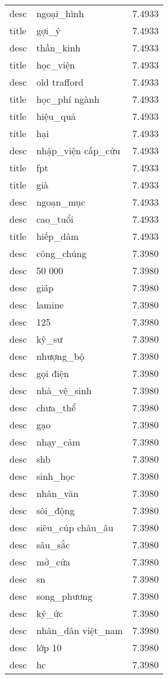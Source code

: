 \documentclass{article}
\begin{document}
\begin{tabular}{lll}
desc & ngoại\_hình & 7.4933\\
title & gợi\_ý & 7.4933\\
desc & thần\_kinh & 7.4933\\
title & học\_viện & 7.4933\\
desc & old trafford & 7.4933\\
title & học\_phí ngành & 7.4933\\
title & hiệu\_quả & 7.4933\\
title & hại & 7.4933\\
desc & nhập\_viện cấp\_cứu & 7.4933\\
title & fpt & 7.4933\\
title & già & 7.4933\\
desc & ngoạn\_mục & 7.4933\\
desc & cao\_tuổi & 7.4933\\
title & hiếp\_dâm & 7.4933\\
desc & công\_chúng & 7.3980\\
desc & 50 000 & 7.3980\\
desc & giáp & 7.3980\\
desc & lamine & 7.3980\\
desc & 125 & 7.3980\\
desc & kỹ\_sư & 7.3980\\
desc & nhượng\_bộ & 7.3980\\
desc & gọi điện & 7.3980\\
desc & nhà\_vệ\_sinh & 7.3980\\
desc & chưa\_thể & 7.3980\\
desc & gạo & 7.3980\\
desc & nhạy\_cảm & 7.3980\\
desc & shb & 7.3980\\
desc & sinh\_học & 7.3980\\
desc & nhân\_văn & 7.3980\\
desc & sôi\_động & 7.3980\\
desc & siêu\_cúp châu\_âu & 7.3980\\
desc & sâu\_sắc & 7.3980\\
desc & mở\_cửa & 7.3980\\
desc & sn & 7.3980\\
desc & song\_phương & 7.3980\\
desc & ký\_ức & 7.3980\\
desc & nhân\_dân việt\_nam & 7.3980\\
desc & lớp 10 & 7.3980\\
desc & hc & 7.3980\\

\end{tabular}
\end{document}
